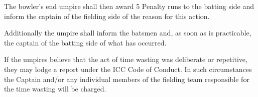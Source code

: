 \documentclass[12pt]{article}
\begin{document}
\vspace{\baselineskip}

\vspace{\baselineskip}

\vspace{\baselineskip}

\vspace{\baselineskip}

\vspace{\baselineskip}
\begin{Center}
{\fontsize{8pt}{9.6pt}\par}
\end{Center}\par


\vspace{\baselineskip}

\vspace{\baselineskip}
\begin{adjustwidth}{0.5in}{0.21in}
{\fontsize{9pt}{10.8pt}\selectfont The bowler’s end umpire shall then award 5 Penalty runs to the batting side and inform the captain of the fielding side of the reason for this action.\par}\par

\end{adjustwidth}


\vspace{\baselineskip}
\begin{adjustwidth}{0.5in}{0.22in}
{\fontsize{9pt}{10.8pt}\selectfont Additionally the umpire shall inform the batsmen and, as soon as is practicable, the captain of the batting side of what has occurred.\par}\par

\end{adjustwidth}


\vspace{\baselineskip}
\begin{adjustwidth}{0.5in}{0.03in}
{\fontsize{9pt}{10.8pt}\selectfont If the umpires believe that the act of time wasting was deliberate or repetitive, they may lodge a report under the ICC Code of Conduct. In such circumstances the Captain and/or any individual members of the fielding team responsible for the time wasting will be charged.\par}\par

\end{adjustwidth}
\end{document}
